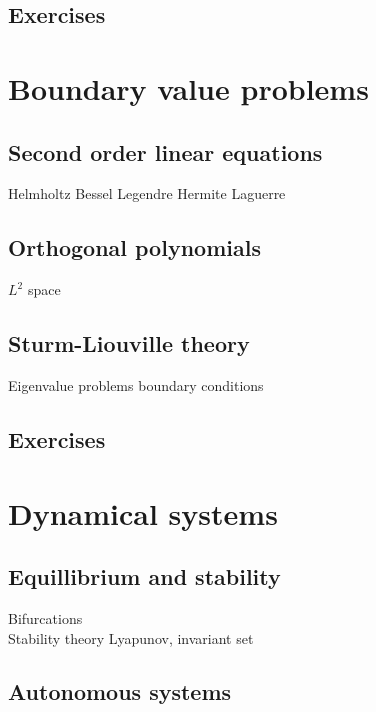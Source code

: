 \documentclass{../../large}
\begin{document}
\section*{Exercises}

\begin{prb}
\end{prb}



\chapter{Boundary value problems}
\section{Second order linear equations}
Helmholtz
Bessel
Legendre
Hermite
Laguerre

\section{Orthogonal polynomials}
$L^2$ space

\section{Sturm-Liouville theory}
Eigenvalue problems
boundary conditions

\section*{Exercises}
\begin{prb}
\end{prb}







\chapter{Dynamical systems}
\section{Equillibrium and stability}
Bifurcations\\
Stability theory
Lyapunov, invariant set

\section{Autonomous systems}
\end{document}
